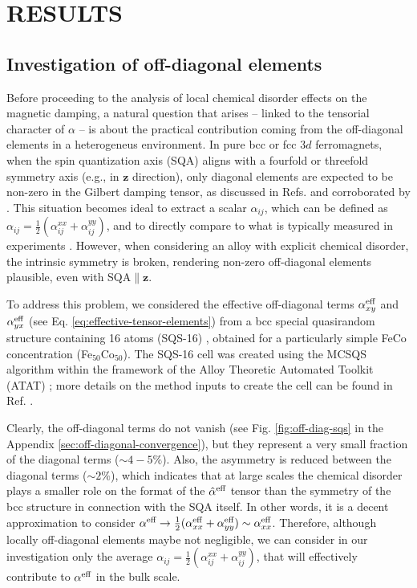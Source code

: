 \section{RESULTS}
\label{sec:results}

\subsection{Investigation of off-diagonal elements}
\label{sec:off-diagonal-elements}

Before proceeding to the analysis of local chemical disorder effects on the magnetic damping, a natural question that arises -- linked to the tensorial character of $\alpha$ -- is about the practical contribution coming from the off-diagonal elements in a heterogeneus environment. In pure bcc or fcc $3d$ ferromagnets, when the spin quantization axis (SQA) aligns with a fourfold or threefold symmetry axis (e.g., in $\mathbf{z}$ direction), only diagonal elements are expected to be non-zero in the Gilbert damping tensor, as discussed in Refs. \cite{eriksson2017atomistic,PhysRevB.72.064450,PhysRevMaterials.2.013801} and corroborated by \cite{PhysRevB.108.014433}. This situation becomes ideal to extract a scalar $\alpha_{ij}$, which can be defined as $\alpha_{ij}=\frac{1}{2}\left(\alpha_{ij}^{xx}+\alpha_{ij}^{yy}\right)$, and to directly compare to what is typically measured in experiments \cite{PhysRevB.108.014433}. However, when considering an alloy with explicit chemical disorder, the intrinsic symmetry is broken, rendering non-zero off-diagonal elements plausible, even with SQA$\parallel\mathbf{z}$.

To address this problem, we considered the effective off-diagonal terms $\alpha^{\textnormal{eff}}_{xy}$ and $\alpha^{\textnormal{eff}}_{yx}$ (see Eq. \ref{eq:effective-tensor-elements}) from a bcc special quasirandom structure containing 16 atoms (SQS-16) \cite{Zunger1990}, obtained for a particularly simple FeCo concentration (Fe$_{50}$Co$_{50}$). The SQS-16 cell was created using the MCSQS algorithm within the framework of the Alloy Theoretic Automated Toolkit (ATAT) \cite{vandeWalle2013}; more details on the method inputs to create the cell can be found in Ref. \cite{PhysRevB.108.014433}.

Clearly, the off-diagonal terms do not vanish (see Fig. \ref{fig:off-diag-sqs} in the Appendix \ref{sec:off-diagonal-convergence}), but they represent a very small fraction of the diagonal terms ($\sim4-5\%$). Also, the asymmetry is reduced between the diagonal terms ($\sim2\%$), which indicates that at large scales the chemical disorder plays a smaller role on the format of the $\hat{\alpha}^{\textnormal{eff}}$ tensor than the symmetry of the bcc structure in connection with the SQA itself. In other words, it is a decent approximation to consider $\alpha^{\textnormal{eff}}\rightarrow\frac{1}{2}(\alpha_{xx}^{\textnormal{eff}}+\alpha_{yy}^{\textnormal{eff}})\sim\alpha_{xx}^{\textnormal{eff}}$. Therefore, although locally off-diagonal elements maybe not negligible, we can consider in our investigation only the average $\alpha_{ij}=\frac{1}{2}\left(\alpha_{ij}^{xx}+\alpha_{ij}^{yy}\right)$, that will effectively contribute to $\alpha^{\textnormal{eff}}$ in the bulk scale.


